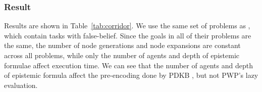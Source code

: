 \subsubsection{Result}
Results are shown in Table~\ref{tab:corridor}.
We use the same set of problems as \citet{DBLP:journals/ai/MuiseBFMMPS22}, which contain tasks with false-belief.
Since the goals in all of their problems are the same, the number of node generations and node expansions are constant across all problems, while only the number of agents and depth of epistemic formulae affect execution time. 
We can see that the number of agents and depth of epistemic formula affect the pre-encoding done by PDKB \citet{DBLP:journals/ai/MuiseBFMMPS22}, but not PWP's lazy evaluation. 


                  
